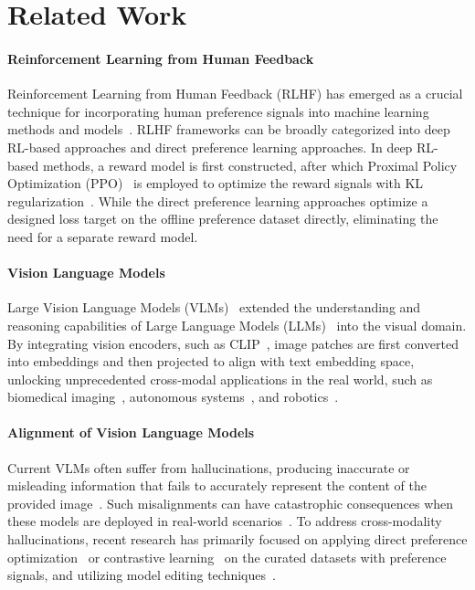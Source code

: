 \section{Related Work}
\paragraph{Reinforcement Learning from Human Feedback} 
Reinforcement Learning from Human Feedback (RLHF) has emerged as a crucial technique for incorporating human preference signals into machine learning methods and models~\citep{dong2024rlhf}. RLHF frameworks can be broadly categorized into deep RL-based approaches and direct preference learning approaches. In deep RL-based methods, a reward model is first constructed, after which Proximal Policy Optimization (PPO)~\citep{schulman2017proximal, christiano2017deep, ziegler2019fine} is employed to optimize the reward signals with KL regularization~\citep{ouyang2022training, touvron2023llama2}. While the direct preference learning approaches optimize a designed loss target on the offline preference dataset directly, eliminating the need for a separate reward model\citep{rafailov2024direct,ipo,gpo,ethayarajh2024kto}.

\paragraph{Vision Language Models} 
Large Vision Language Models (VLMs)~\citep{li2022blip, li2023blip2, liu2024llava,llavanext,llama3.2, Qwen-VL, Qwen2VL, lu2024deepseek, wu2024deepseek} extended the understanding and reasoning capabilities of Large Language Models (LLMs)~\citep{devlin2018bert, radford2019gpt2,brown2020gpt3,team2023gemini,roziere2023codellama,touvron2023llama,touvron2023llama2, raffel2020t5,qwen2,qwen2.5} into the visual domain. By integrating vision encoders, such as CLIP~\citep{radford2021clip}, image patches are first converted into embeddings and then projected to align with text embedding space, unlocking unprecedented cross-modal applications in the real world, such as biomedical imaging~\citep{moor2023med,li2024llava-med}, autonomous systems~\citep{shao2024lmdrive,tian2024drivevlm,sima2023drivelm,openemma}, and robotics~\citep{rana2023sayplan,kim2024openvla}.

\paragraph{Alignment of Vision Language Models}
Current VLMs often suffer from hallucinations, producing inaccurate or misleading information that fails to accurately represent the content of the provided image~\citep{zhu2024unraveling,bai2024hallucination}. Such misalignments can have catastrophic consequences when these models are deployed in real-world scenarios~\citep{autotrust}.
To address cross-modality hallucinations, recent research has primarily focused on applying direct preference optimization~\citep{deng2024stic,zhou2024povid,fang2024vila,zhou2024calibrated,guo2024direct,chen2024dress,wang2024enhancing,yu2024rlhf,li2023silkie,wang2024mdpo} or contrastive learning~\citep{sarkar2024mitigating} on the curated datasets with preference signals, and utilizing model editing techniques~\citep{liu2024paying,yu2024attention}.